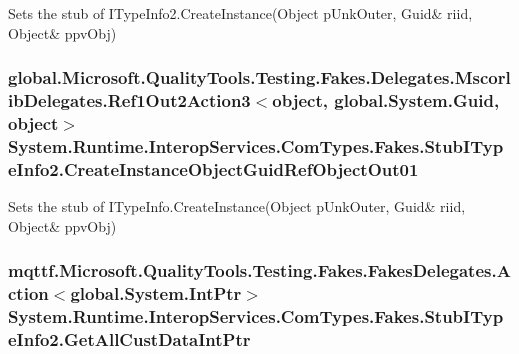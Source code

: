 Sets the stub of I\-Type\-Info2.\-Create\-Instance(Object p\-Unk\-Outer, Guid\& riid, Object\& ppv\-Obj)

\hypertarget{class_system_1_1_runtime_1_1_interop_services_1_1_com_types_1_1_fakes_1_1_stub_i_type_info2_a23343d664fbd611dba2e77315f9fc012}{
\subsubsection[{Create\-Instance\-Object\-Guid\-Ref\-Object\-Out01}]{\setlength{\rightskip}{0pt plus 5cm}global.\-Microsoft.\-Quality\-Tools.\-Testing.\-Fakes.\-Delegates.\-Mscorlib\-Delegates.\-Ref1\-Out2\-Action3$<$object, global.\-System.\-Guid, object$>$ System.\-Runtime.\-Interop\-Services.\-Com\-Types.\-Fakes.\-Stub\-I\-Type\-Info2.\-Create\-Instance\-Object\-Guid\-Ref\-Object\-Out01}}\label{class_system_1_1_runtime_1_1_interop_services_1_1_com_types_1_1_fakes_1_1_stub_i_type_info2_a23343d664fbd611dba2e77315f9fc012}


Sets the stub of I\-Type\-Info.\-Create\-Instance(Object p\-Unk\-Outer, Guid\& riid, Object\& ppv\-Obj)

\hypertarget{class_system_1_1_runtime_1_1_interop_services_1_1_com_types_1_1_fakes_1_1_stub_i_type_info2_a28ba9f48baf9fd88a311455065ef33b2}{
\subsubsection[{Get\-All\-Cust\-Data\-Int\-Ptr}]{\setlength{\rightskip}{0pt plus 5cm}mqttf.\-Microsoft.\-Quality\-Tools.\-Testing.\-Fakes.\-Fakes\-Delegates.\-Action$<$global.\-System.\-Int\-Ptr$>$ System.\-Runtime.\-Interop\-Services.\-Com\-Types.\-Fakes.\-Stub\-I\-Type\-Info2.\-Get\-All\-Cust\-Data\-Int\-Ptr}}\label{class_system_1_1_runtime_1_1_interop_services_1_1_com_types_1_1_fakes_1_1_stub_i_type_info2_a28ba9f48baf9fd88a311455065ef33b2}


